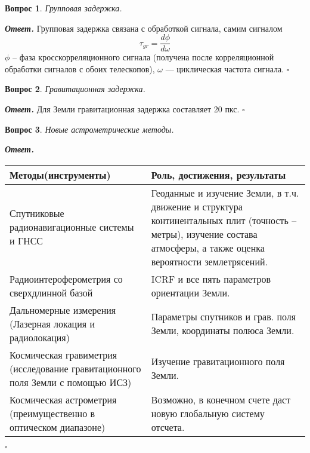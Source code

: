 \documentclass[12pt]{article}
\newtheorem{problem}{Вопрос}
\newenvironment{solution}[1][\it{Ответ}]{\textbf{#1. } }{$\square$}
\begin{document}
		
		\begin{problem}
			Групповая задержка.
		\end{problem}
		
		\begin{solution}
			Групповая задержка связана с обработкой сигнала, самим сигналом $$\tau_{gr} = \frac{d\phi}{d\omega}$$
			$\phi$ -- фаза кросскорреляционного сигнала (получена после корреляционной обработки сигналов с обоих телескопов), $\omega$ — циклическая частота сигнала.
		\end{solution}
		
		\begin{problem}
			Гравитационная задержка.
		\end{problem}
		
		\begin{solution}
		Для Земли гравитационная задержка составляет 20 пкс.
		\end{solution}
		
		
		
		\begin{problem}
			Новые астрометрические методы.
		\end{problem}
		
		\begin{solution}
			\begin{center}
				\begin{tabular}{||p{8cm} p{8cm}||} 
					\hline
					Методы(инструменты) & Роль, достижения, результаты  \\ [0.5ex] 
					\hline\hline
					Спутниковые радионавигационные системы и ГНСС & Геоданные и изучение Земли, в т.ч. движение и структура континентальных плит (точность -- метры), изучение состава атмосферы, а также оценка вероятности землетрясений. \\ 
					\hline
					Радиоинтероферометрия со сверхдлинной базой & ICRF и все пять параметров ориентации Земли. \\
					\hline
					Дальномерные измерения (Лазерная локация и радиолокация) & Параметры спутников и грав. поля Земли, координаты полюса Земли. \\
					\hline
					Космическая гравиметрия (исследование гравитационного поля Земли с помощью ИСЗ) & Изучение гравитационного поля Земли.  \\
					\hline
					Космическая астрометрия (преимущественно в оптическом диапазоне) & Возможно, в конечном счете даст новую глобальную систему отсчета.  \\ [1ex] 
					\hline
				\end{tabular}
			\end{center}
		\end{solution}
		
\end{document}
